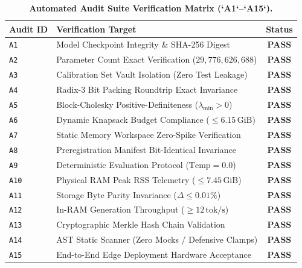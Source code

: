 \documentclass[10pt,twocolumn,letterpaper]{article}
\begin{document}
\begin{table}[h]
\centering
\small
\caption{\textbf{Automated Audit Suite Verification Matrix (`A1`–`A15`).}}
\label{tab:audit_matrix}
\begin{tabularx}{\columnwidth}{l X c}
\toprule
\textbf{Audit ID} & \textbf{Verification Target} & \textbf{Status} \\
\midrule
\texttt{A1} & Model Checkpoint Integrity \& SHA-256 Digest & \textbf{PASS} \\
\texttt{A2} & Parameter Count Exact Verification ($29,776,626,688$) & \textbf{PASS} \\
\texttt{A3} & Calibration Set Vault Isolation (Zero Test Leakage) & \textbf{PASS} \\
\texttt{A4} & Radix-3 Bit Packing Roundtrip Exact Invariance & \textbf{PASS} \\
\texttt{A5} & Block-Cholesky Positive-Definiteness ($\lambda_{\min} > 0$) & \textbf{PASS} \\
\texttt{A6} & Dynamic Knapsack Budget Compliance ($\le 6.15\,\text{GiB}$) & \textbf{PASS} \\
\texttt{A7} & Static Memory Workspace Zero-Spike Verification & \textbf{PASS} \\
\texttt{A8} & Preregistration Manifest Bit-Identical Invariance & \textbf{PASS} \\
\texttt{A9} & Deterministic Evaluation Protocol ($\text{Temp} = 0.0$) & \textbf{PASS} \\
\texttt{A10} & Physical RAM Peak RSS Telemetry ($\le 7.45\,\text{GiB}$) & \textbf{PASS} \\
\texttt{A11} & Storage Byte Parity Invariance ($\Delta \le 0.01\%$) & \textbf{PASS} \\
\texttt{A12} & In-RAM Generation Throughput ($\ge 12\,\text{tok/s}$) & \textbf{PASS} \\
\texttt{A13} & Cryptographic Merkle Hash Chain Validation & \textbf{PASS} \\
\texttt{A14} & AST Static Scanner (Zero Mocks / Defensive Clamps) & \textbf{PASS} \\
\texttt{A15} & End-to-End Edge Deployment Hardware Acceptance & \textbf{PASS} \\
\bottomrule
\end{tabularx}
\end{table}
\end{document}
